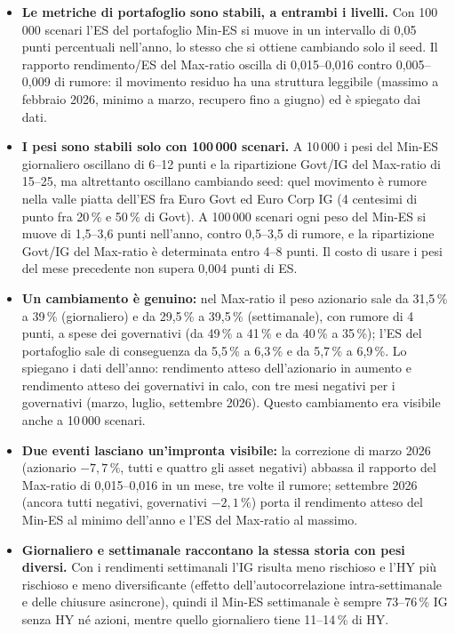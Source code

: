 \documentclass[11pt,a4paper]{article}
\begin{document}
\begin{itemize}
\item \textbf{Le metriche di portafoglio sono stabili, a entrambi i livelli.} Con 100\,000 scenari l'ES del portafoglio Min-ES si muove in un intervallo di 0,05 punti percentuali nell'anno, lo stesso che si ottiene cambiando solo il seed. Il rapporto rendimento/ES del Max-ratio oscilla di 0,015--0,016 contro 0,005--0,009 di rumore: il movimento residuo ha una struttura leggibile (massimo a febbraio 2026, minimo a marzo, recupero fino a giugno) ed \`e spiegato dai dati.
\item \textbf{I pesi sono stabili solo con 100\,000 scenari.} A 10\,000 i pesi del Min-ES giornaliero oscillano di 6--12 punti e la ripartizione Govt/IG del Max-ratio di 15--25, ma altrettanto oscillano cambiando seed: quel movimento \`e rumore nella valle piatta dell'ES fra Euro Govt ed Euro Corp IG (4 centesimi di punto fra 20\,\% e 50\,\% di Govt). A 100\,000 scenari ogni peso del Min-ES si muove di 1,5--3,6 punti nell'anno, contro 0,5--3,5 di rumore, e la ripartizione Govt/IG del Max-ratio \`e determinata entro 4--8 punti. Il costo di usare i pesi del mese precedente non supera 0,004 punti di ES.
\item \textbf{Un cambiamento \`e genuino:} nel Max-ratio il peso azionario sale da 31,5\,\% a 39\,\% (giornaliero) e da 29,5\,\% a 39,5\,\% (settimanale), con rumore di 4 punti, a spese dei governativi (da 49\,\% a 41\,\% e da 40\,\% a 35\,\%); l'ES del portafoglio sale di conseguenza da 5,5\,\% a 6,3\,\% e da 5,7\,\% a 6,9\,\%. Lo spiegano i dati dell'anno: rendimento atteso dell'azionario in aumento e rendimento atteso dei governativi in calo, con tre mesi negativi per i governativi (marzo, luglio, settembre 2026). Questo cambiamento era visibile anche a 10\,000 scenari.
\item \textbf{Due eventi lasciano un'impronta visibile:} la correzione di marzo 2026 (azionario $-7{,}7\,\%$, tutti e quattro gli asset negativi) abbassa il rapporto del Max-ratio di 0,015--0,016 in un mese, tre volte il rumore; settembre 2026 (ancora tutti negativi, governativi $-2{,}1\,\%$) porta il rendimento atteso del Min-ES al minimo dell'anno e l'ES del Max-ratio al massimo.
\item \textbf{Giornaliero e settimanale raccontano la stessa storia con pesi diversi.} Con i rendimenti settimanali l'IG risulta meno rischioso e l'HY pi\`u rischioso e meno diversificante (effetto dell'autocorrelazione intra-settimanale e delle chiusure asincrone), quindi il Min-ES settimanale \`e sempre 73--76\,\% IG senza HY n\'e azioni, mentre quello giornaliero tiene 11--14\,\% di HY.

\end{itemize}
\end{document}
